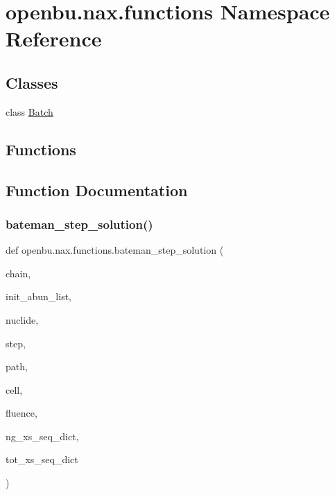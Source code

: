 \hypertarget{namespaceopenbu_1_1nax_1_1functions}{}\section{openbu.\+nax.\+functions Namespace Reference}
\label{namespaceopenbu_1_1nax_1_1functions}
\subsection*{Classes}
\begin{DoxyCompactItemize}
\item 
class \mbox{\hyperlink{classopenbu_1_1nax_1_1functions_1_1_batch}{Batch}}
\end{DoxyCompactItemize}
\subsection*{Functions}


\subsection{Function Documentation}
\mbox{\label{namespaceopenbu_1_1nax_1_1functions_a2674867736944ce3d5d6a8793a1f5dc9}} 
\subsubsection{\texorpdfstring{bateman\+\_\+step\+\_\+solution()}{bateman\_step\_solution()}}
{\footnotesize\ttfamily def openbu.\+nax.\+functions.\+bateman\+\_\+step\+\_\+solution (\begin{DoxyParamCaption}\item[{}]{chain,  }\item[{}]{init\+\_\+abun\+\_\+list,  }\item[{}]{nuclide,  }\item[{}]{step,  }\item[{}]{path,  }\item[{}]{cell,  }\item[{}]{fluence,  }\item[{}]{ng\+\_\+xs\+\_\+seq\+\_\+dict,  }\item[{}]{tot\+\_\+xs\+\_\+seq\+\_\+dict }\end{DoxyParamCaption})}

